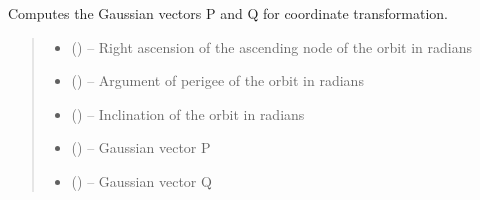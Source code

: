 \documentclass[letterpaper,10pt,english]{sphinxmanual}
\begin{document}

\begin{fulllineitems}
\label{\detokenize{fspsim.utils:fspsim.utils.Propagators.compute_gaussian_vectors}}
\pysigstartsignatures
{}
\pysigstopsignatures
\sphinxAtStartPar
Computes the Gaussian vectors P and Q for coordinate transformation.
\begin{quote}\begin{description}
\begin{itemize}
\item {} 
\sphinxAtStartPar
{} () – Right ascension of the ascending node of the orbit in radians

\item {} 
\sphinxAtStartPar
{} () – Argument of perigee of the orbit in radians

\item {} 
\sphinxAtStartPar
{} () – Inclination of the orbit in radians

\end{itemize}

\sphinxAtStartPar
\begin{itemize}
\item {} 
\sphinxAtStartPar
{} () – Gaussian vector P

\item {} 
\sphinxAtStartPar
{} () – Gaussian vector Q

\end{itemize}


\end{description}\end{quote}

\end{fulllineitems}
\end{document}

